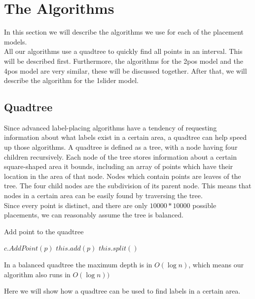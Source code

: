 \documentclass[crop=false,a4paper,oneside,11pt]{article}
\begin{document}
\section{The Algorithms}
In this section we will describe the algorithms we use for each of the placement models.\\
All our algorithms use a quadtree to quickly find all points in an interval. This will be described first. Furthermore, the algorithms for the 2pos model and the 4pos model are very similar, these will be discussed together. After that, we will describe the algorithm for the 1slider model.

\subsection{Quadtree}

Since advanced label-placing algorithms have a tendency of requesting information about what labels exist in a certain area, a quadtree can help speed up those algorithms. A quadtree is defined as a tree, with a node having four children recursively. Each node of the tree stores information about a certain square-shaped area it bounds, including an array of points which have their location in the area of that node. Nodes which contain points are leaves of the tree. The four child nodes are the subdivision of its parent node. This means that nodes in a certain area can be easily found by traversing the tree.\\
Since every point is distinct, and there are only $10000 * 10000$ possible placements, we can reasonably assume the tree is balanced.\\
\begin{algorithm}[H]
\caption{Add point to the quadtree}
\begin{algorithmic}[1]
\State $c.AddPoint(p)$
\EndIf
\EndFor
\Else{}
\State $this.add(p)$
\State $this.split()$ 
\EndIf
\EndIf
\EndProcedure
\end{algorithmic}
\end{algorithm}
In a balanced quadtree the maximum depth is in $O(\log{n})$, which means our algorithm also runs in $O(\log{n}))$

Here we will show how a quadtree can be used to find labels in a certain area.\\
\end{document}
